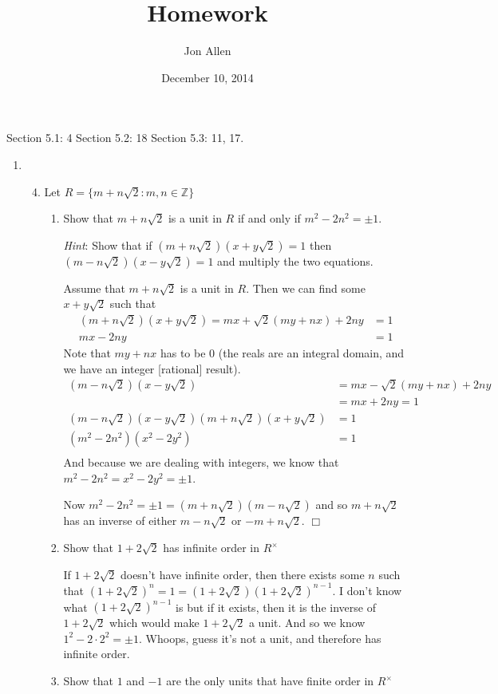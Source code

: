 \documentclass[letterpaper]{article}
\begin{document}
\title{Homework}
\date{December 10, 2014}
\author{Jon Allen}
\maketitle
Section 5.1: 4
Section 5.2: 18
Section 5.3: 11, 17.
\renewcommand{\labelenumi}{5.\arabic{enumi}}
\renewcommand{\labelenumii}{\arabic{enumii}.}
\renewcommand{\labelenumiii}{(\alph{enumiii})}
\begin{enumerate}
\item
  \begin{enumerate}
  \setcounter{enumii}{3}
  \item
  Let $R=\{m+n\sqrt{2}:m,n\in \mathbb{Z}\}$
    \begin{enumerate}
    \item
    Show that $m+n\sqrt{2}$ is a unit in $R$ if and only if $m^2-2n^2=\pm 1.$

    {\em Hint}: Show that if $(m+n\sqrt{2})(x+y\sqrt{2})=1$ then $(m-n\sqrt{2})(x-y\sqrt{2})=1$ and multiply the two equations.

    Assume that $m+n\sqrt{2}$ is a unit in $R$. Then we can find some $x+y\sqrt{2}$ such that
    \begin{align*}
      (m+n\sqrt{2})(x+y\sqrt{2})=mx+\sqrt{2}(my+nx)+2ny&=1\\
      mx-2ny&=1
    \end{align*}
    Note that $my+nx$ has to be $0$ (the reals are an integral domain, and we have an integer [rational] result).
    \begin{align*}
      (m-n\sqrt{2})(x-y\sqrt{2})&=mx-\sqrt{2}(my+nx)+2ny\\
      &=mx+2ny=1\\
      (m-n\sqrt{2})(x-y\sqrt{2})(m+n\sqrt{2})(x+y\sqrt{2})&=1\\
      (m^2-2n^2)(x^2-2y^2)&=1\\
    \end{align*}
    And because we are dealing with integers, we know that $m^2-2n^2=x^2-2y^2=\pm 1$.
    
    Now $m^2-2n^2=\pm 1=(m+n\sqrt{2})(m-n\sqrt{2})$ and so $m+n\sqrt{2}$ has an inverse of either $m-n\sqrt{2}$ or $-m+n\sqrt{2}$.
    $\Box$
    \item
    Show that $1+2\sqrt{2}$ has infinite order in $R^\times$

    If $1+2\sqrt{2}$ doesn't  have infinite order, then there exists some $n$ such that $(1+2\sqrt{2})^n=1=(1+2\sqrt{2})(1+2\sqrt{2})^{n-1}$. I don't know what $(1+2\sqrt{2})^{n-1}$ is but if it exists, then it is the inverse of $1+2\sqrt{2}$ which would make $1+2\sqrt{2}$ a unit. And so we know $1^2-2\cdot 2^2=\pm 1$. Whoops, guess it's not a unit, and therefore has infinite order.
    \item
    Show that $1$ and $-1$ are the only  units that have finite order in $R^\times$


\end{enumerate}
\end{enumerate}
\end{enumerate}
\end{document}
